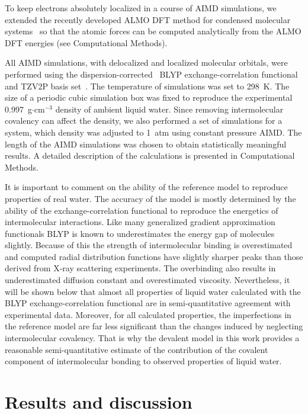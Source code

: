 \documentclass[aps,prl,reprint,amsmath,amssymb]{revtex4-1}
\begin{document}
To keep electrons absolutely localized in a course of AIMD simulations, we extended the recently developed ALMO DFT method for  condensed molecular systems~\cite{Khaliullin2013JCTC} so that the atomic forces can be computed analytically from the ALMO DFT energies (see Computational Methods).

All AIMD simulations, with delocalized and localized molecular orbitals, were performed using the dispersion-corrected~\cite{grimme2010consistent} BLYP exchange-correlation functional~\cite{becke1988density, lee1988development} and TZV2P basis set~\cite{vandevondele2007gaussian}. 
The temperature of simulations was set to 298~K. 
The size of a periodic cubic simulation box was fixed to reproduce the experimental 0.997~g$\cdot$cm$^{-3}$ density of ambient liquid water. 
Since removing intermolecular covalency can affect the density, we also performed a set of simulations for a system, which density was adjusted to 1~atm using constant pressure AIMD. 
The length of the AIMD simulations was chosen to obtain statistically meaningful results. 
A detailed description of the calculations is presented in Computational Methods.

It is important to comment on the ability of the reference model to reproduce properties of real water. 
The accuracy of the model is mostly determined by the ability of the exchange-correlation functional to reproduce the energetics of intermolecular interactions. Like many generalized gradient approximation functionals BLYP is known to underestimates the energy gap of molecules slightly. 
Because of this the strength of intermolecular binding is overestimated and computed radial distribution functions have slightly sharper peaks than those derived from X-ray scattering experiments. 
The overbinding also results in underestimated diffusion constant and overestimated viscosity. 
Nevertheless, it will be shown below that almost all properties of liquid water calculated with the BLYP exchange-correlation functional are in semi-quantitative agreement with experimental data. 
Moreover, for all calculated properties, the imperfections in the reference model are far less significant than the changes induced by neglecting intermolecular covalency. 
That is why the devalent model in this work provides a reasonable semi-quantitative estimate of the contribution of the covalent component of intermolecular bonding to observed properties of liquid water.


\section{Results and discussion}
\end{document}
